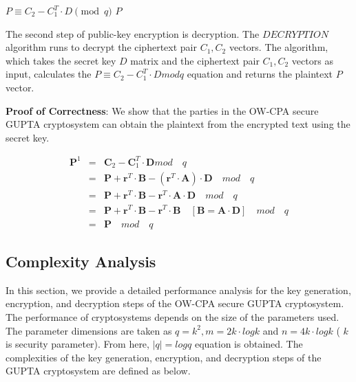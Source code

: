 \documentclass[a4paper,fleqn]{cas-dc}
\begin{document}
	\begin{algorithm}
		\label{decrypt}
		\begin{algorithmic}
			\State $ P   \equiv C_2 - C_1^T \cdot D \pmod q$
			\State \Return $ P $ 
			\EndProcedure 
		\end{algorithmic}
		\label{Algorithm:3}
	\end{algorithm}

	The second step of public-key encryption is decryption. The $ DECRYPTION $ algorithm runs to decrypt the ciphertext pair $ C_1, C_2 $ vectors. The algorithm, which takes the secret key $ D $ matrix and the ciphertext pair $ C_1, C_2 $ vectors as input, calculates the $ P \equiv C_2 - C_1^T \cdot D mod q $ equation and returns the plaintext $ P $ vector.
	
	\textbf{Proof of Correctness}: We show that the parties in the OW-CPA secure GUPTA cryptosystem can obtain the plaintext from the encrypted text using the secret key.


	\begin{eqnarray}
		\textbf{P}^1 &=& \textbf{C}_2 - \textbf{C}_1^T\cdot \textbf{D} mod \quad q \nonumber \\
		&=& \textbf{P} + \textbf{r}^T\cdot \textbf{B} - (\textbf{r}^T \cdot \textbf{A})\cdot \textbf{D}\quad mod \quad q \nonumber \\
		&=& \textbf{P} + \textbf{r}^T\cdot \textbf{B} - \textbf{r}^T \cdot \textbf{A}\cdot \textbf{D}\quad mod \quad q	\nonumber \\
		&=& \textbf{P} + \textbf{r}^T\cdot \textbf{B} - \textbf{r}^T \cdot \textbf{B} \quad [\textbf{B} = \textbf{A}\cdot \textbf{D}]\quad mod \quad q \nonumber  \\
		&=& \textbf{P}\quad mod \quad q \nonumber
	\end{eqnarray}

\subsection{Complexity Analysis}
In this section, we provide a detailed performance analysis for the key generation, encryption, and decryption steps of the OW-CPA secure GUPTA cryptosystem. The performance of cryptosystems depends on the size of the parameters used. The parameter dimensions are taken as $ q = k^2, m = 2k \cdot log k $ and $ n = 4k \cdot log k $ ( $ k $ is security parameter). From here, $ | q | = log q $ equation is obtained. The complexities of the key generation, encryption, and decryption steps of the GUPTA cryptosystem are defined as below.
\end{document}
